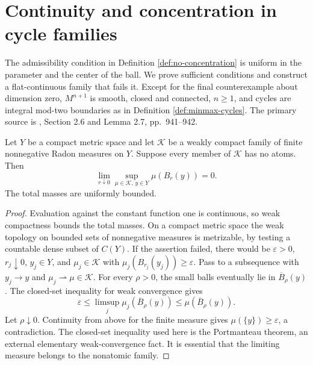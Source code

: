 \chapter{Continuity and concentration in cycle families}\label{sec:sweepout-concentration}
The admissibility condition in Definition \ref{def:no-concentration} is uniform in the parameter and the center of the ball. We prove sufficient conditions and construct a flat-continuous family that fails it. Except for the final counterexample about dimension zero, $M^{n+1}$ is smooth, closed and connected, $n\geq1$, and cycles are integral mod-two boundaries as in Definition \ref{def:minmax-cycles}. The primary source is \cite{LMN}, Section 2.6 and Lemma 2.7, pp.~941--942.

\begin{lemma}\label{lem:compact-nonatomic-measures}
Let $Y$ be a compact metric space and let $\mathcal K$ be a weakly compact family of finite nonnegative Radon measures on $Y$. Suppose every member of $\mathcal K$ has no atoms. Then
\[
 \lim_{r\downarrow0}\sup_{\mu\in\mathcal K,\,y\in Y}\mu(B_r(y))=0.
\]
The total masses are uniformly bounded.
\end{lemma}
\begin{proof}
Evaluation against the constant function one is continuous, so weak compactness bounds the total masses. On a compact metric space the weak topology on bounded sets of nonnegative measures is metrizable, by testing a countable dense subset of $C(Y)$. If the assertion failed, there would be $\varepsilon>0$, $r_j\downarrow0$, $y_j\in Y$, and $\mu_j\in\mathcal K$ with $\mu_j(B_{r_j}(y_j))\geq\varepsilon$. Pass to a subsequence with $y_j\to y$ and $\mu_j\rightharpoonup\mu\in\mathcal K$. For every $\rho>0$, the small balls eventually lie in $\overline B_\rho(y)$. The closed-set inequality for weak convergence gives
\[
 \varepsilon\leq\limsup_j\mu_j(\overline B_\rho(y))\leq\mu(\overline B_\rho(y)).
\]
Let $\rho\downarrow0$. Continuity from above for the finite measure gives $\mu(\{y\})\geq\varepsilon$, a contradiction. The closed-set inequality used here is the Portmanteau theorem, an external elementary weak-convergence fact. It is essential that the limiting measure belongs to the nonatomic family.
\end{proof}

